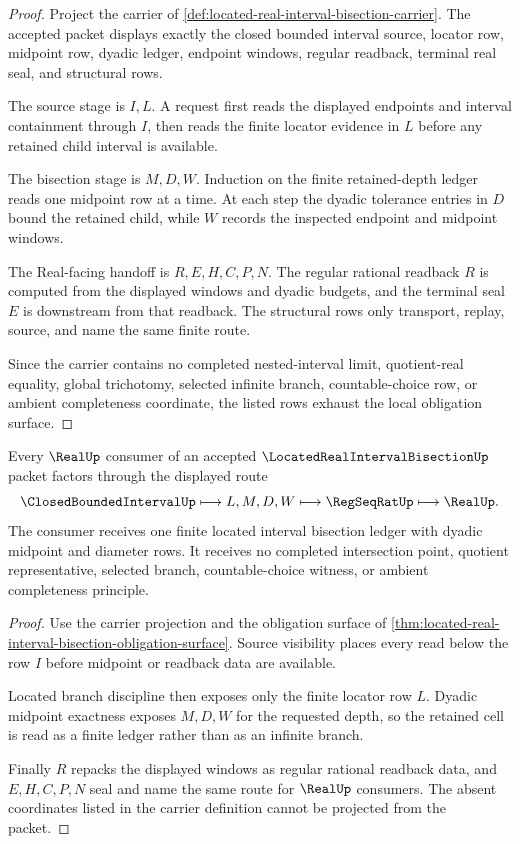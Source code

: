 \begin{proof}
Project the carrier of \autoref{def:located-real-interval-bisection-carrier}. The accepted packet displays exactly the closed bounded interval source, locator row, midpoint row, dyadic ledger, endpoint windows, regular readback, terminal real seal, and structural rows.

The source stage is $I,L$. A request first reads the displayed endpoints and interval containment through $I$, then reads the finite locator evidence in $L$ before any retained child interval is available.

The bisection stage is $M,D,W$. Induction on the finite retained-depth ledger reads one midpoint row at a time. At each step the dyadic tolerance entries in $D$ bound the retained child, while $W$ records the inspected endpoint and midpoint windows.

The Real-facing handoff is $R,E,H,C,P,N$. The regular rational readback $R$ is computed from the displayed windows and dyadic budgets, and the terminal seal $E$ is downstream from that readback. The structural rows only transport, replay, source, and name the same finite route.

Since the carrier contains no completed nested-interval limit, quotient-real equality, global trichotomy, selected infinite branch, countable-choice row, or ambient completeness coordinate, the listed rows exhaust the local obligation surface.
\end{proof}

\begin{theorem}
\label{thm:located-real-interval-bisection-finite-handoff}
Every $\RealUp$ consumer of an accepted $\LocatedRealIntervalBisectionUp$ packet factors through the displayed route
$$
\ClosedBoundedIntervalUp \longmapsto L,M,D,W \longmapsto \RegSeqRatUp \longmapsto \RealUp .
$$
The consumer receives one finite located interval bisection ledger with dyadic midpoint and diameter rows. It receives no completed intersection point, quotient representative, selected branch, countable-choice witness, or ambient completeness principle.
\end{theorem}
\begin{proof}
Use the carrier projection and the obligation surface of \autoref{thm:located-real-interval-bisection-obligation-surface}. Source visibility places every read below the row $I$ before midpoint or readback data are available.

Located branch discipline then exposes only the finite locator row $L$. Dyadic midpoint exactness exposes $M,D,W$ for the requested depth, so the retained cell is read as a finite ledger rather than as an infinite branch.

Finally $R$ repacks the displayed windows as regular rational readback data, and $E,H,C,P,N$ seal and name the same route for $\RealUp$ consumers. The absent coordinates listed in the carrier definition cannot be projected from the packet.
\end{proof}

